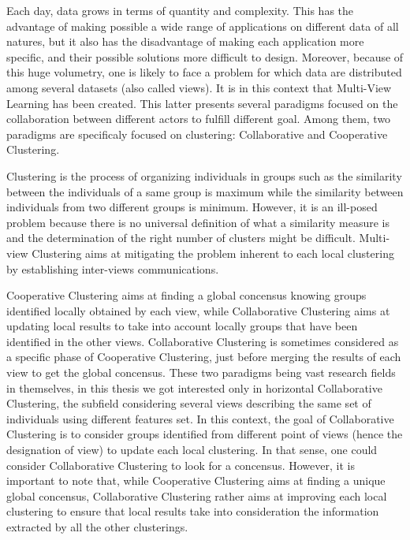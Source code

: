 Each day, data grows in terms of quantity and complexity. This has the advantage of making possible a wide range of applications on different data of all natures, but it also has the disadvantage of making each application more specific, and their possible solutions more difficult to design. Moreover, because of this huge volumetry, one is likely to face a problem for which data are distributed among several datasets (also called views). It is in this context that Multi-View Learning has been created. This latter presents several paradigms focused on the collaboration between different actors to fulfill different goal. Among them, two paradigms are specificaly focused on clustering: Collaborative and Cooperative Clustering.

Clustering is the process of organizing individuals in groups such as the similarity between the individuals of a same group is maximum while the similarity between individuals from two different groups is minimum. However, it is an ill-posed problem because there is no universal definition of what a similarity measure is and the determination of the right number of clusters might be difficult. Multi-view Clustering aims at mitigating the problem inherent to each local clustering by establishing inter-views communications.

Cooperative Clustering aims at finding a global concensus knowing groups identified locally obtained by each view, while Collaborative Clustering aims at updating local results to take into account locally groups that have been identified in the other views. Collaborative Clustering is sometimes considered as a specific phase of Cooperative Clustering, just before merging the results of each view to get the global concensus. These two paradigms being vast research fields in themselves, in this thesis we got interested only in horizontal Collaborative Clustering, the subfield considering several views describing the same set of individuals using different features set. In this context, the goal of Collaborative Clustering is to consider groups identified from different point of views (hence the designation of view) to update each local clustering. In that sense, one could consider Collaborative Clustering to look for a concensus. However, it is important to note that, while Cooperative Clustering aims at finding a unique global concensus, Collaborative Clustering rather aims at improving each local clustering to ensure that local results take into consideration the information extracted by all the other clusterings.

